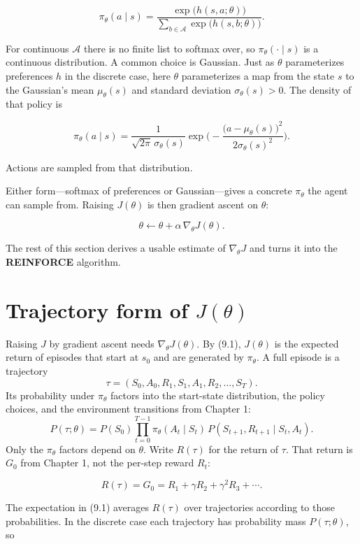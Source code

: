 \[
\pi_\theta(a\mid s)
=
\frac{\exp\bigl(h(s,a;\theta)\bigr)}
{\sum_{b\in\mathcal{A}}\exp\bigl(h(s,b;\theta)\bigr)}.
\]

For continuous $\mathcal{A}$ there is no finite list to softmax over, so $\pi_\theta(\cdot\mid s)$ is a continuous distribution. A common choice is Gaussian. Just as $\theta$ parameterizes preferences $h$ in the discrete case, here $\theta$ parameterizes a map from the state $s$ to the Gaussian's mean $\mu_\theta(s)$ and standard deviation $\sigma_\theta(s)>0$. The density of that policy is

\[
\pi_\theta(a\mid s)
=
\frac{1}{\sqrt{2\pi}\,\sigma_\theta(s)}
\exp\Biggl(
-\frac{\bigl(a-\mu_\theta(s)\bigr)^2}{2\sigma_\theta(s)^2}
\Biggr).
\]

Actions are sampled from that distribution.

Either form---softmax of preferences or Gaussian---gives a concrete $\pi_\theta$ the agent can sample from. Raising $J(\theta)$ is then gradient ascent on $\theta$:

\[
\theta
\leftarrow
\theta+\alpha\,\nabla_\theta J(\theta).
\]

The rest of this section derives a usable estimate of $\nabla_\theta J$ and turns it into the \textbf{REINFORCE} algorithm.

\section{Trajectory form of $J(\theta)$}

Raising $J$ by gradient ascent needs $\nabla_\theta J(\theta)$. By (9.1), $J(\theta)$ is the expected return of episodes that start at $s_0$ and are generated by $\pi_\theta$. A full episode is a trajectory \[
\tau
=
(S_0,A_0,R_1,S_1,A_1,R_2,\ldots,S_T).
\] Its probability under $\pi_\theta$ factors into the start-state distribution, the policy choices, and the environment transitions from Chapter 1: \begin{equation}
P(\tau;\theta)
=
P(S_0)
\prod_{t=0}^{T-1}
\pi_\theta(A_t\mid S_t)\,
P(S_{t+1},R_{t+1}\mid S_t,A_t).
\tag{9.2}
\end{equation} Only the $\pi_\theta$ factors depend on $\theta$. Write $R(\tau)$ for the return of $\tau$. That return is $G_0$ from Chapter 1, not the per-step reward $R_t$:

\[
R(\tau)
=
G_0
=
R_1+\gamma R_2+\gamma^2 R_3+\cdots.
\]

The expectation in (9.1) averages $R(\tau)$ over trajectories according to those probabilities. In the discrete case each trajectory has probability mass $P(\tau;\theta)$, so

